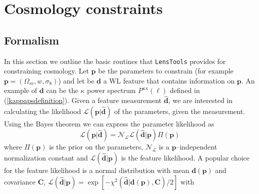 \documentclass[reprint,aps,prd,superscriptaddress,showkeys,showpacs]{revtex4-1}
\newcommand{\bb}[1]{\mathbf{#1}}
\newcommand{\bbh}[1]{\mathbf{\hat{#1}}}
\newcommand{\LT}{\texttt{LensTools} }
\begin{document}
\section{Cosmology constraints}

\subsection{Formalism}
%
In this section we outline the basic routines that \LT provides for constraining cosmology. Let $\bb{p}$ be the parameters to constrain (for example $\bb{p}=(\Omega_m,w,\sigma_8)$) and let be $\bb{d}$ a WL feature that contains information on $\bb{p}$. An example of $\bb{d}$ can be the $\kappa$ power spectrum $P^{\kappa\kappa}(\ell)$ defined in (\ref{kappapsdefinition}). Given a feature measurement $\bbh{d}$, we are interested in calculating the likelihood $\mathcal{L}(\bb{p}\vert\bbh{d})$ of the parameters, given the measurement. Using the Bayes theorem we can express the parameter likelihood as 
\begin{equation}
\label{parameterlikelihood}
\mathcal{L}(\bb{p}\vert\bbh{d}) = \mathcal{N}_\mathcal{L}\mathcal{L}(\bbh{d}\vert\bb{p})\Pi(\bb{p})
\end{equation} 
%
where $\Pi(\bb{p})$ is the prior on the parameters, $\mathcal{N}_\mathcal{L}$ is a $\bb{p}$--independent normalization constant and $\mathcal{L}(\bbh{d}\vert\bb{p})$ is the feature likelihood. A popular choice for the feature likelihood is a normal distribution with mean $\bb{d}(\bb{p})$ and covariance $\bb{C}$, $\mathcal{L}(\bbh{d}\vert\bb{p}) = \exp{\left[-\chi^2\left(\bbh{d}\vert\bb{d}(\bb{p}),\bb{C}\right)/2\right]}$ with
\end{document}
